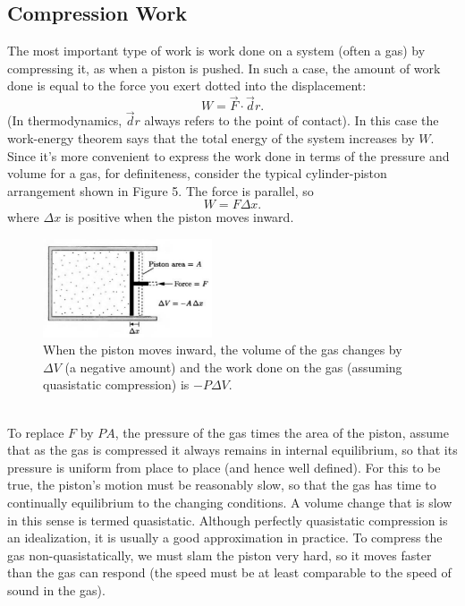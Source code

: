 \documentclass[11pt]{exam}
\begin{document}
\subsection{Compression Work}
The most important type of work is work done on a system (often a gas) by compressing it, as when a piston is pushed. In such a case, the amount of work done is equal to the force you exert dotted into the displacement:
\begin{equation}\tag{1.25}
W = \vec{F}\cdot \vec{d}r.
\end{equation}
(In thermodynamics, $\vec{d}r$ always refers to the point of contact). In this case the work-energy theorem says that the total energy of the system increases by $W$. \\
\hspace*{10mm}Since it's more convenient to express the work done in terms of the pressure and volume for a gas, for definiteness, consider the typical cylinder-piston arrangement shown in Figure 5. The force is parallel, so
\begin{equation}\tag{1.26}
W=F\Delta x.    
\end{equation}
where $\Delta x$ is positive when the piston moves inward. 
\begin{figure}[htp]
    \centering
    \includegraphics[width=5cm]{figure5.png}
    \caption{When the piston moves inward, the volume of the gas changes by $\Delta V$ (a negative amount) and the work done on the gas (assuming quasistatic compression) is $-P\Delta V$.}
\label{fig:quasistatic}
\end{figure}\\
\hspace*{10mm}To replace $F$ by $PA$, the pressure of the gas times the area of the piston, assume that as the gas is compressed it always remains in internal equilibrium, so that its pressure is uniform from place to place (and hence well defined). For this to be true, the piston's motion must be reasonably slow, so that the gas has time to continually equilibrium to the changing conditions. A volume change that is slow in this sense is termed quasistatic. Although perfectly quasistatic compression is an idealization, it is usually a good approximation in practice. To compress the gas non-quasistatically, we must slam the piston very hard, so it moves faster than the gas can respond (the speed must be at least comparable to the speed of sound in the gas). \\
\end{document}
